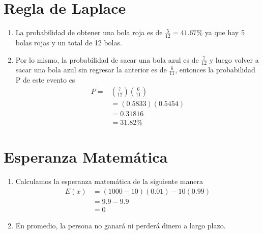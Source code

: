 \documentclass[12pt, letterpaper]{article}
\begin{document}
\newpage

\section{Regla de Laplace}
\begin{enumerate}
    \item La probabilidad de obtener una bola roja es de $\frac{5}{12} = 41.67\%$ ya que hay 5 bolas rojas y un total de 12 bolas.
    \item Por lo mismo, la probabilidad de sacar una bola azul es de $\frac{7}{12}$ y luego volver a sacar una bola azul sin regresar la anterior es de $\frac{6}{11}$, entonces la probabilidad P de este evento es
    \begin{equation*}
        \begin{aligned}
            P = 
            & \left(
                \frac{7}{12}
            \right)
            \left(
                \frac{6}{11}
            \right) \\
            & = (0.5833)(0.5454) \\
            & = 0.31816 \\
            & = 31.82\%
        \end{aligned}
    \end{equation*}
\end{enumerate}

\section{Esperanza Matemática}
\begin{enumerate}
    \item Calculamos la esperanza matemática de la siguiente manera
    \begin{equation*}
        \begin{aligned}
            E(x)
            & = (1000-10)(0.01) - 10(0.99) \\
            & = 9.9 - 9.9 \\
            & = 0
        \end{aligned}
    \end{equation*}
    \item En promedio, la persona no ganará ni perderá dinero a largo plazo.
\end{enumerate}
\end{document}
